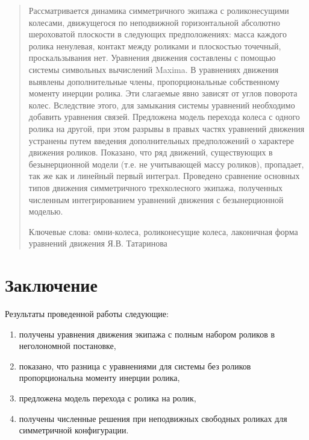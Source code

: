 \begin{abstract}
Рассматривается динамика симметричного экипажа с роликонесущими колесами, движущегося по  неподвижной горизонтальной абсолютно шероховатой плоскости в следующих предположениях: масса каждого ролика ненулевая, контакт между роликами и плоскостью точечный, проскальзывания нет. Уравнения движения составлены с помощью системы символьных вычислений Maxima. В уравнениях движения выявлены дополнительные члены, пропорциональные собственному моменту инерции ролика. Эти слагаемые явно зависят от углов поворота колес. Вследствие этого, для замыкания системы уравнений необходимо добавить уравнения связей. Предложена модель перехода колеса с одного ролика на другой, при этом разрывы в правых частях уравнений движения устранены путем введения дополнительных предположений о характере движения роликов. Показано, что ряд движений, существующих в безынерционной модели (т.е. не учитывающей массу роликов), пропадает, так же как и линейный первый интеграл. Проведено сравнение основных типов движения симметричного трехколесного экипажа, полученных численным интегрированием уравнений движения с безынерционной моделью. 

Ключевые слова: омни-колеса, роликонесущие колеса, лаконичная форма уравнений движения Я.В. Татаринова

\end{abstract}

\newpage
















\section{Заключение}

Результаты проведенной работы следующие:
\begin{enumerate}
    \item получены уравнения движения экипажа с полным набором роликов в неголономной постановке,

    \item показано, что разница с уравнениями для системы без роликов пропорциональна моменту инерции ролика,

    \item предложена модель перехода с ролика на ролик,

    \item получены численные решения при неподвижных свободных роликах для симметричной конфигурации.
\end{enumerate}


